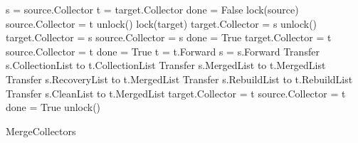 \begin{algorithm}[H]
	\scriptsize
	
	\begin{multicols}{2}
		\begin{algorithmic}[1]
\State s = source.Collector
\State t = target.Collector
\State  done = False
\State lock(source)
\State source.Collector = t
\State unlock()
\EndIf
{}
\State lock(target)
\State target.Collector = s
\State unlock()
\EndIf
{}
\EndIf
{}
\State target.Collector = s
\State source.Collector = s
\State done = True
\State target.Collector = t
\State source.Collector = t
\State done = True
\State t = t.Forward 
\State s = s.Forward 
\Else
\State Transfer s.CollectionList to t.CollectionList 
\State Transfer s.MergedList to t.MergedList 
\State Transfer s.RecoveryList to t.MergedList 
\State Transfer s.RebuildList to t.RebuildList 
\State Transfer s.CleanList to t.MergedList 
\State target.Collector = t
\State source.Collector = t
\State done = True
\EndIf
\State unlock()
\EndWhile
\EndProcedure
\caption{MergeCollectors}
\label{algorithm:mergecollectors}
\end{algorithmic}
\end{multicols}
\end{algorithm}
